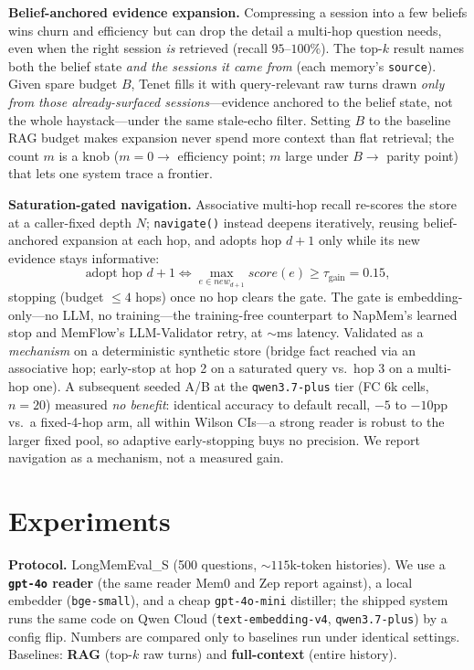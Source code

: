 \documentclass[11pt]{article}
\begin{document}
\textbf{Belief-anchored evidence expansion.} Compressing a session into a few beliefs wins
churn and efficiency but can drop the detail a multi-hop question needs, even when the right
session \emph{is} retrieved (recall $95$--$100\%$). The top-$k$ result names both the belief
state \emph{and the sessions it came from} (each memory's \texttt{source}). Given spare
budget $B$, Tenet fills it with query-relevant raw turns drawn \emph{only from those
already-surfaced sessions}---evidence anchored to the belief state, not the whole
haystack---under the same stale-echo filter. Setting $B$ to the baseline RAG budget makes
expansion never spend more context than flat retrieval; the count $m$ is a knob ($m{=}0\to$
efficiency point; $m$ large under $B\to$ parity point) that lets one system trace a frontier.

\textbf{Saturation-gated navigation.}\label{sec:navigate} Associative multi-hop recall
re-scores the store at a caller-fixed depth $N$; \texttt{navigate()} instead deepens
iteratively, reusing belief-anchored expansion at each hop, and adopts hop $d{+}1$ only
while its new evidence stays informative:
\[
\text{adopt hop } d{+}1 \iff \max_{e\in\textit{new}_{d+1}}\textit{score}(e) \ge
\tau_{\text{gain}} = 0.15,
\]
stopping (budget $\le4$ hops) once no hop clears the gate. The gate is
embedding-only---no LLM, no training---the training-free counterpart to NapMem's
learned stop and MemFlow's LLM-Validator retry, at $\sim$ms latency. Validated as a
\emph{mechanism} on a deterministic synthetic store (bridge fact reached via an
associative hop; early-stop at hop 2 on a saturated query vs.\ hop 3 on a multi-hop
one). A subsequent seeded A/B at the \texttt{qwen3.7-plus} tier (FC 6k cells,
$n{=}20$) measured \emph{no benefit}: identical accuracy to default recall, $-5$
to $-10$pp vs.\ a fixed-4-hop arm, all within Wilson CIs---a strong reader is
robust to the larger fixed pool, so adaptive early-stopping buys no precision.
We report navigation as a mechanism, not a measured gain.

\section{Experiments}
\textbf{Protocol.} LongMemEval\_S (500 questions, ${\sim}115$k-token histories).
We use a \textbf{\texttt{gpt-4o} reader} (the same reader Mem0 and Zep report against), a local embedder (\texttt{bge-small}), and a cheap \texttt{gpt-4o-mini} distiller; the shipped system runs the same code on Qwen Cloud (\texttt{text-embedding-v4}, \texttt{qwen3.7-plus}) by a config flip. Numbers are compared only to baselines run under identical settings.
Baselines: \textbf{RAG} (top-$k$ raw turns) and \textbf{full-context} (entire history).
\end{document}
